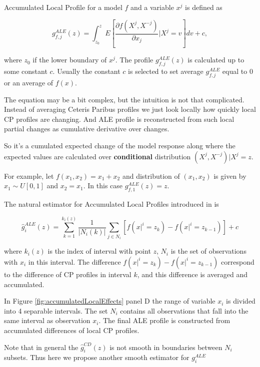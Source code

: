 \documentclass[12pt,]{krantz}
\begin{document}
Accumulated Local Profile for a model \(f\) and a variable \(x^j\) is defined as

\begin{equation}
g^{ALE}_{f, j}(z) = \int_{z_0}^z E\left[\frac{\partial f(X^j, X^{-j})}{\partial x_j}|X^j = v\right] dv + c,
\label{eq:ALEdef}
\end{equation}

where \(z_0\) if the lower boundary of \(x^j\). The profile \(g^{ALE}_{f, j}(z)\) is calculated up to some constant \(c\). Usually the constant \(c\) is selected to set average \(g^{ALE}_{f, j}\) equal to 0 or an average of \(f(x)\).

The equation may be a bit complex, but the intuition is not that complicated. Instead of averaging Ceteris Paribus profiles we just look locally how quickly local CP profiles are changing. And ALE profile is reconstructed from such local partial changes as cumulative derivative over changes.

So it's a cumulated expected change of the model response along where the expected values are calculated over \textbf{conditional} distribution \((X^j,X^{-j})|X^j=z\).

For example, let \(f(x_1, x_2) = x_1 + x_2\) and distribution of \((x_1, x_2)\) is given by \(x_1 \sim U[0,1]\) and \(x_2=x_1\). In this case \(g^{ALE}_{f, 1}(z) = z\).

The natural estimator for Accumulated Local Profiles introduced in \citep{ALEPlotRPackage} is

\begin{equation}
\hat g^{ALE}_i(z) = \sum_{k=1}^{k_i(z)} \frac{1}{|N_i(k)|} \sum_{j \in N_i} \left[ f(x|^i = z_k) - f(x|^i = z_{k-1}) \right] + c
\label{eq:ALEPest}
\end{equation}

where \(k_i(z)\) is the index of interval with point \(z\), \(N_i\) is the set of observations with \(x_i\) in this interval. The difference \(f(x|^i = z_k) - f(x|^i = z_{k-1})\) correspond to the difference of CP profiles in interval \(k\), and this difference is averaged and accumulated.

In Figure \ref{fig:accumulatedLocalEffects} panel D the range of variable \(x_i\) is divided into 4 separable intervals. The set \(N_i\) contains all observations that fall into the same interval as observation \(x_i\). The final ALE profile is constructed from accumulated differences of local CP profiles.

Note that in general the \(\hat g^{CD}_i(z)\) is not smooth in boundaries between \(N_i\) subsets. Thus here we propose another smooth estimator for \(g_i^{ALE}\)
\end{document}
